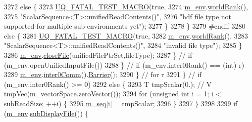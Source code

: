 \begin{DoxyCode}
3272             \textcolor{keywordflow}{else} \{
3273               \hyperlink{_defines_8h_a56d63d18d0a6d45757de47fcc06f574d}{UQ\_FATAL\_TEST\_MACRO}(\textcolor{keyword}{true},
3274                                   \hyperlink{class_q_u_e_s_o_1_1_scalar_sequence_a71618cd6351b29361b437af68447a4c8}{m\_env}.\hyperlink{class_q_u_e_s_o_1_1_base_environment_a78b57112bbd0e6dd0e8afec00b40ffa7}{worldRank}(),
3275                                   \textcolor{stringliteral}{"ScalarSequence<T>::unifiedReadContents()"},
3276                                   \textcolor{stringliteral}{"hdf file type not supported for multiple sub-environments yet"});
3277             \}
3278           \}
3279 \textcolor{preprocessor}{#endif}
3280 \textcolor{preprocessor}{}          \textcolor{keywordflow}{else} \{
3281             \hyperlink{_defines_8h_a56d63d18d0a6d45757de47fcc06f574d}{UQ\_FATAL\_TEST\_MACRO}(\textcolor{keyword}{true},
3282                                 \hyperlink{class_q_u_e_s_o_1_1_scalar_sequence_a71618cd6351b29361b437af68447a4c8}{m\_env}.\hyperlink{class_q_u_e_s_o_1_1_base_environment_a78b57112bbd0e6dd0e8afec00b40ffa7}{worldRank}(),
3283                                 \textcolor{stringliteral}{"ScalarSequence<T>::unifiedReadContents()"},
3284                                 \textcolor{stringliteral}{"invalid file type"});
3285           \}
3286           \hyperlink{class_q_u_e_s_o_1_1_scalar_sequence_a71618cd6351b29361b437af68447a4c8}{m\_env}.\hyperlink{class_q_u_e_s_o_1_1_base_environment_ab712bff194ddd91459d4ea8715c77e8b}{closeFile}(unifiedFilePtrSet,fileType);
3287         \} \textcolor{comment}{// if (m\_env.openUnifiedInputFile())}
3288       \} \textcolor{comment}{// if (m\_env.inter0Rank() == (int) r)}
3289       \hyperlink{class_q_u_e_s_o_1_1_scalar_sequence_a71618cd6351b29361b437af68447a4c8}{m\_env}.\hyperlink{class_q_u_e_s_o_1_1_base_environment_a689e4d140c74d495d97eb498714a4b82}{inter0Comm}().\hyperlink{class_q_u_e_s_o_1_1_mpi_comm_a4059971c30e023b272fccaa6aa00c426}{Barrier}();
3290     \} \textcolor{comment}{// for r}
3291   \} \textcolor{comment}{// if (m\_env.inter0Rank() >= 0)}
3292   \textcolor{keywordflow}{else} \{
3293     T tmpScalar(0.); \textcolor{comment}{// V tmpVec(m\_vectorSpace.zeroVector());}
3294     \textcolor{keywordflow}{for} (\textcolor{keywordtype}{unsigned} \textcolor{keywordtype}{int} i = 1; i < subReadSize; ++i) \{
3295       \hyperlink{class_q_u_e_s_o_1_1_scalar_sequence_ae616036fd2e62fb69df167814545e893}{m\_seq}[i] = tmpScalar;
3296     \}
3297   \}
3298 
3299   \textcolor{keywordflow}{if} (\hyperlink{class_q_u_e_s_o_1_1_scalar_sequence_a71618cd6351b29361b437af68447a4c8}{m\_env}.\hyperlink{class_q_u_e_s_o_1_1_base_environment_a8a0064746ae8dddfece4229b9ad374d6}{subDisplayFile}()) \{

\end{DoxyCode}
